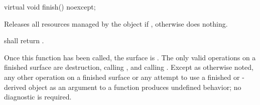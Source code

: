 \begin{itemdecl}
virtual void finish() noexcept;
\end{itemdecl}
\begin{itemdescr}
\pnum
\effects
Releases all resources managed by the  object  if , otherwise does nothing.

\pnum
\postconditions
{} shall return .

\pnum
\remarks
Once this function has been called, the surface is . The only valid operations on a finished surface are destruction, calling , and calling . Except as otherwise noted, any other operation on a finished surface or any attempt to use a finished  or -derived object as an argument to a function produces undefined behavior; no diagnostic is required.
\end{itemdescr}

